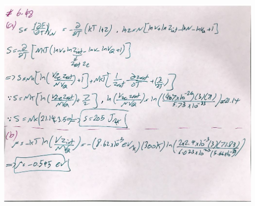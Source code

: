 \documentclass[fleqn]{article}
\begin{document}
\begin{enumerate}
      \begin{center}
        \includegraphics[height=15cm, width=16cm]{648.JPG}
      \end{center}

    \pagebreak

  \end{enumerate}
\end{document}
